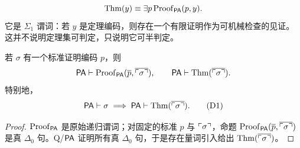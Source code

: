 \begin{definition}[定理谓词]\label{def:thm}
\[
\mathrm{Thm}(y)\equiv \exists p\,\mathrm{Proof}_{\mathsf{PA}}(p,y).
\]
它是 \(\Sigma_1\) 谓词：若 \(y\) 是定理编码，则存在一个有限证明作为可机械检查的见证。
这并不说明定理集可判定，只说明它可半判定。
\end{definition}

\begin{lemma}\label{lem:d1}
若 \(\sigma\) 有一个标准证明编码 \(p\)，则
\[
\mathsf{PA}\vdash \mathrm{Proof}_{\mathsf{PA}}(\overline{p},\overline{\ulcorner \sigma\urcorner}),
\qquad
\mathsf{PA}\vdash \mathrm{Thm}(\overline{\ulcorner \sigma\urcorner}).
\]
特别地，
\[
\mathsf{PA}\vdash\sigma \implies \mathsf{PA}\vdash \mathrm{Thm}(\overline{\ulcorner \sigma\urcorner}). \tag{D1}
\]
\end{lemma}

\begin{proof}
\(\mathrm{Proof}_{\mathsf{PA}}\) 是原始递归谓词；对固定的标准 \(p\) 与 \(\ulcorner \sigma\urcorner\)，命题
\(\mathrm{Proof}_{\mathsf{PA}}(\overline{p},\overline{\ulcorner \sigma\urcorner})\) 是真 \(\Delta_0\) 句。Q/\(\mathsf{PA}\) 证明所有真
\(\Delta_0\) 句，于是存在量词引入给出 \(\mathrm{Thm}(\overline{\ulcorner \sigma\urcorner})\)。
\end{proof}
